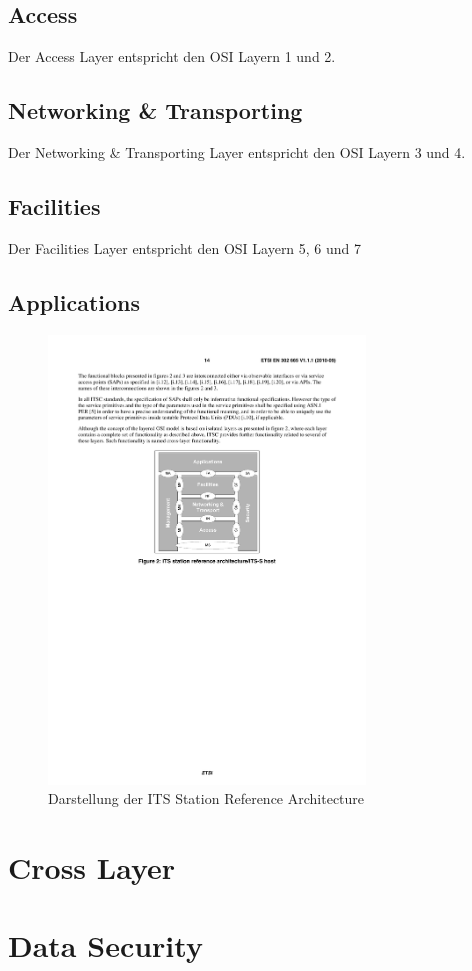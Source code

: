 \subsection{Access}
Der Access Layer entspricht den \ac{OSI} Layern 1 und 2. 

\subsection{Networking \& Transporting}
Der Networking \& Transporting Layer entspricht den \ac{OSI} Layern 3 und 4.

\subsection{Facilities}
Der Facilities Layer entspricht den \ac{OSI} Layern 5, 6 und 7

\subsection{Applications}


\begin{figure}
\includegraphics[width=0.75\textwidth]{content/images/02_architektur/stationReferenceArchitecture.pdf}
\caption{Darstellung der ITS Station Reference Architecture \cite{etsi2010302}}
\label{fig:funktionsweise_referenceArchitecture}
\end{figure}

\section{Cross Layer}

\section{Data Security}

